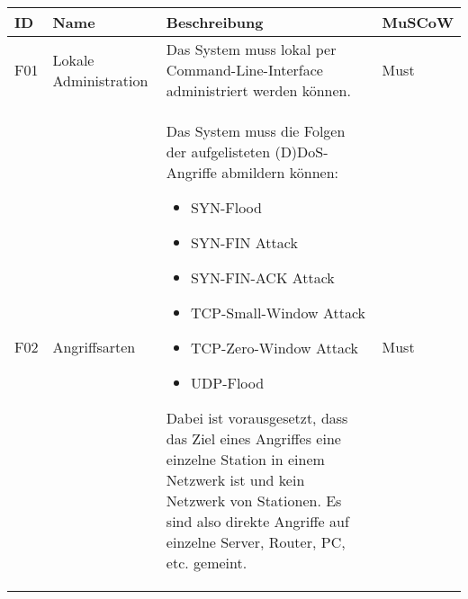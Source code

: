 \documentclass[../review_1.tex]{subfiles}
\begin{document}
\begin{longtable} [h] {p{1cm} p{4cm} p{7cm} l}
    \textbf{ID}                                                                                                                                                                                                      & \textbf{Name}                                  & \textbf{Beschreibung}                                                                                                                                                                                                                                   & \textbf{MuSCoW} \\ \toprule \endhead
    F01                                                                                                                                                                                                              & Lokale Administration                          & Das System muss lokal per Command-Line-Interface administriert werden können.                                                                                                                                                                           & Must            \\
    F02                                                                                                                                                                                                              & Angriffsarten                                  & Das System muss die Folgen der aufgelisteten (D)DoS-Angriffe abmildern können: \begin{itemize} \setlength{\parskip}{-2pt}
        \item SYN-Flood
        \item SYN-FIN Attack
        \item SYN-FIN-ACK Attack
        \item TCP-Small-Window Attack
        \item TCP-Zero-Window Attack
        \item UDP-Flood
    \end{itemize}
    Dabei ist vorausgesetzt, dass das Ziel eines Angriffes eine einzelne Station in einem Netzwerk ist und kein Netzwerk von Stationen. Es sind also direkte Angriffe auf einzelne Server, Router, PC, etc. gemeint. & Must                                                                                                                                                                                                                                                                                                                       \\

\end{longtable}
\end{document}
